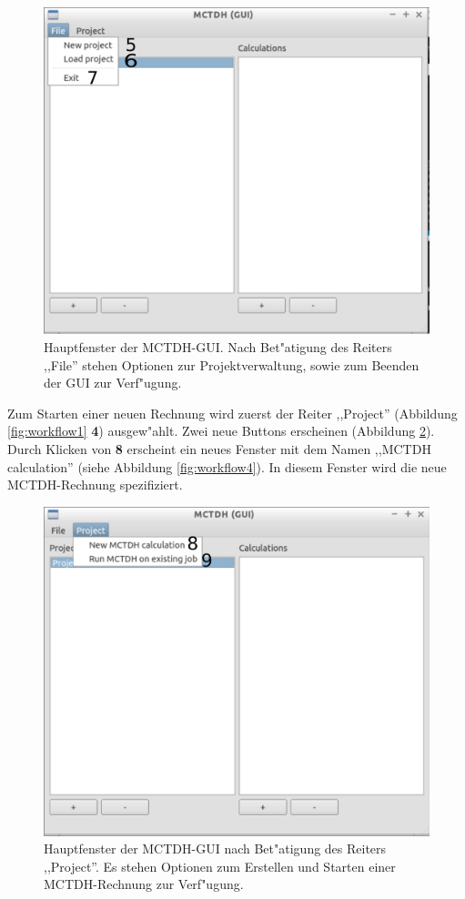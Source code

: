 \begin{figure}
    \centering
    \includegraphics[scale=0.5]{figures/screenMainFile}
    \caption{Hauptfenster der MCTDH-GUI. Nach Bet"atigung des Reiters ,,File''
		stehen Optionen zur Projektverwaltung, sowie zum Beenden der GUI zur Verf"ugung.}\label{fig:workflow2}
\end{figure}

Zum Starten einer neuen Rechnung wird zuerst der Reiter ,,Project'' (Abbildung \ref{fig:workflow1} \textbf{4}) 
ausgew"ahlt. Zwei neue Buttons erscheinen (Abbildung \ref{fig:workflow3}). Durch Klicken von \textbf{8} 
erscheint ein neues Fenster mit dem Namen ,,MCTDH calculation'' (siehe Abbildung \ref{fig:workflow4}). 
In diesem Fenster wird die neue MCTDH-Rechnung spezifiziert.

\begin{figure}
    \centering
    \includegraphics[scale=0.5]{figures/screenMainProject}
    \caption{Hauptfenster der MCTDH-GUI nach Bet"atigung des Reiters ,,Project''. Es stehen Optionen zum Erstellen und Starten einer
    MCTDH-Rechnung zur Verf"ugung.}\label{fig:workflow3}
\end{figure}

